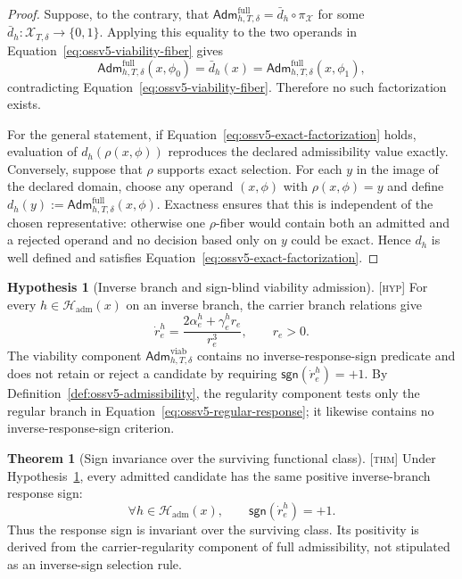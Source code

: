 \documentclass[11pt]{article}
\newcommand{\Hyp}{\textsc{[hyp]}}
\newcommand{\Thm}{\textsc{[thm]}}
\theoremstyle{definition}
\newtheorem{hypothesis}[definition]{Hypothesis}
\newtheorem{theorem}[definition]{Theorem}
\begin{document}
\begin{proof}
Suppose, to the contrary, that
$\mathsf{Adm}^{\mathrm{full}}_{h,T,\delta}=\bar d_h\circ\pi_{\mathcal X}$ for some
$\bar d_h:\mathcal X_{T,\delta}\to\{0,1\}$.  Applying this equality to the
two operands in Equation~\eqref{eq:ossv5-viability-fiber} gives
\begin{equation}
\mathsf{Adm}^{\mathrm{full}}_{h,T,\delta}(x,\phi_0)
=
\bar d_h(x)
=
\mathsf{Adm}^{\mathrm{full}}_{h,T,\delta}(x,\phi_1),
\end{equation}
contradicting Equation~\eqref{eq:ossv5-viability-fiber}.  Therefore no such
factorization exists.

For the general statement, if Equation~\eqref{eq:ossv5-exact-factorization}
holds, evaluation of $d_h(\rho(x,\phi))$ reproduces the declared admissibility
value exactly.  Conversely, suppose that $\rho$ supports exact selection.  For
each $y$ in the image of the declared domain, choose any operand
$(x,\phi)$ with $\rho(x,\phi)=y$ and define
$d_h(y):=\mathsf{Adm}^{\mathrm{full}}_{h,T,\delta}(x,\phi)$.  Exactness ensures that this is
independent of the chosen representative: otherwise one $\rho$-fiber would
contain both an admitted and a rejected operand and no decision based only on
$y$ could be exact.  Hence $d_h$ is well defined and satisfies
Equation~\eqref{eq:ossv5-exact-factorization}.
\end{proof}

\begin{hypothesis}[Inverse branch and sign-blind viability admission]
\label{hyp:ossv5-sign-neutrality}
\Hyp{} For every $h\in\mathcal H_{\mathrm{adm}}(x)$ on an inverse branch,
the carrier branch relations give
\begin{equation}
\dot r_e^h=
\frac{2\alpha_e^h+\gamma_e^h r_e}{r_e^3},
\qquad r_e>0.
\label{eq:ossv5-inverse-response}
\end{equation}
The viability component
$\mathsf{Adm}^{\mathrm{viab}}_{h,T,\delta}$ contains no inverse-response-sign
predicate and does not retain or reject a candidate by requiring
$\mathsf{sgn}(\dot r_e^h)=+1$.  By Definition~\ref{def:ossv5-admissibility},
the regularity component tests only the regular branch in
Equation~\eqref{eq:ossv5-regular-response}; it likewise contains no
inverse-response-sign criterion.
\end{hypothesis}

\begin{theorem}[Sign invariance over the surviving functional class]
\label{thm:ossv5-sign-invariance}
\Thm{} Under Hypothesis~\ref{hyp:ossv5-sign-neutrality}, every admitted
candidate has the same positive inverse-branch response sign:
\begin{equation}
\forall h\in\mathcal H_{\mathrm{adm}}(x),
\qquad
\mathsf{sgn}(\dot r_e^h)=+1.
\label{eq:ossv5-sign-invariance}
\end{equation}
Thus the response sign is invariant over the surviving class.  Its positivity
is derived from the carrier-regularity component of full admissibility, not
stipulated as an inverse-sign selection rule.
\end{theorem}
\end{document}
